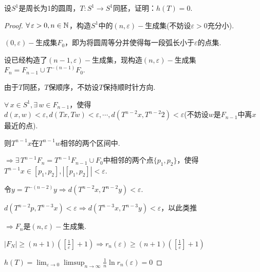 \begin{instance}
    设$S^1$是周长为1的圆周，$T:S^1\to S^1$同胚，证明：$h(T)=0$.
\end{instance}
\begin{proof}
    $\forall\,\varepsilon>0,n\in\mathbb{N}$，构造$S^1$中的$(n,\varepsilon)-$生成集(不妨设$\varepsilon>0$充分小).\par
    $(0,\varepsilon)-$生成集$F_0$，即为将圆周等分并使得每一段弧长小于$\varepsilon$的点集.\par
    设已经构造了$(n-1,\varepsilon)-$生成集，现构造$(n,\varepsilon)-$生成集$F_n=F_{n-1}\cup T^{-(n-1)}F_0$.\par
    由于$T$同胚，$T$保顺序，不妨设$T$保持顺时针方向.\par
    $\forall\, x\in S^1,\exists\, w\in F_{n-1}$，使得$d(x,w)<\varepsilon,d(Tx,Tw)<\varepsilon,\cdots,d(T^{n-2}x,T^{n-2}2)<\varepsilon$(不妨设$w$是$F_{n-1}$中离$x$最近的点).\par
    则$T^{n-1}x$在$T^{n-1}w$相邻的两个区间中.\par
    $\Rightarrow \exists\, T^{n-1}F_n=T^{n-1}F_{n-1}\cup F_0$中相邻的两个点$\{p_1,p_2\}$，使得$T^{n-1}x\in [p_1,p_2],\left|[p_1,p_2]\right|<\varepsilon$.\par
    令$y=T^{-(n-2)}y\Rightarrow d\left(T^{n-2}x,T^{n-2}y\right)<\varepsilon$.\par
    $d\left(T^{n-2}p,T^{n-3}x\right)<\varepsilon\Rightarrow d\left(T^{n-3}x,T^{n-3}y\right)<\varepsilon$，以此类推 \par
    $\Rightarrow F_n$是$(n,\varepsilon)-$生成集.\par
    $|F_N|\geq(n+1)\left(\left[\frac{1}{\varepsilon}\right]+1\right)\Rightarrow r_n(\varepsilon)\geq (n+1)\left(\left[\frac{1}{\varepsilon}\right]+1\right)$\par
    $h(T)=\lim_{\varepsilon\to 0}\limsup_{n\to\infty}\frac{1}{n}\ln{r_n(\varepsilon)}=0$
\end{proof}







